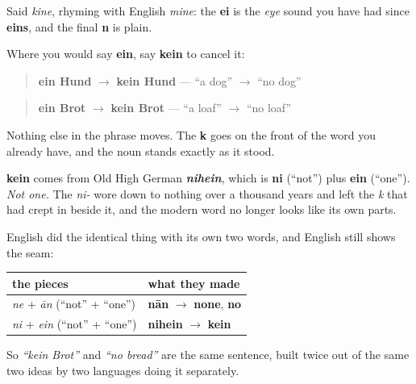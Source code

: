 Said \emph{kine}, rhyming with English \emph{mine}: the \textbf{ei} is the \emph{eye} sound you have had since \textbf{eins}, and the final \textbf{n} is plain.

Where you would say \textbf{ein}, say \textbf{kein} to cancel it:

\begin{quote}
\textbf{ein Hund} $\to$ \textbf{kein Hund} — \textquotedblleft{}a dog\textquotedblright{} $\to$ \textquotedblleft{}no dog\textquotedblright{}
\end{quote}

\begin{quote}
\textbf{ein Brot} $\to$ \textbf{kein Brot} — \textquotedblleft{}a loaf\textquotedblright{} $\to$ \textquotedblleft{}no loaf\textquotedblright{}
\end{quote}

Nothing else in the phrase moves. The \textbf{k} goes on the front of the word you already have, and the noun stands exactly as it stood.

\begin{cousinweb}
\textbf{kein} comes from Old High German \emph{\textbf{nihein}}, which is \textbf{ni} (\textquotedblleft{}not\textquotedblright{}) plus \textbf{ein} (\textquotedblleft{}one\textquotedblright{}). \emph{Not one.} The \emph{ni-} wore down to nothing over a thousand years and left the \emph{k} that had crept in beside it, and the modern word no longer looks like its own parts.

English did the identical thing with its own two words, and English still shows the seam:

\noindent
\begin{tabularx}{\linewidth}{@{}>{\raggedright\arraybackslash}X>{\raggedright\arraybackslash}X@{}}
\toprule
\textbf{the pieces} & \textbf{what they made} \\
\midrule
\emph{ne} + \emph{ān} (\textquotedblleft{}not\textquotedblright{} + \textquotedblleft{}one\textquotedblright{}) & \textbf{nān} $\to$ \textbf{none}, \textbf{no} \\
\emph{ni} + \emph{ein} (\textquotedblleft{}not\textquotedblright{} + \textquotedblleft{}one\textquotedblright{}) & \textbf{nihein} $\to$ \textbf{kein} \\
\bottomrule
\end{tabularx}

So \emph{\textquotedblleft{}kein Brot\textquotedblright{}} and \emph{\textquotedblleft{}no bread\textquotedblright{}} are the same sentence, built twice out of the same two ideas by two languages doing it separately.
\end{cousinweb}

